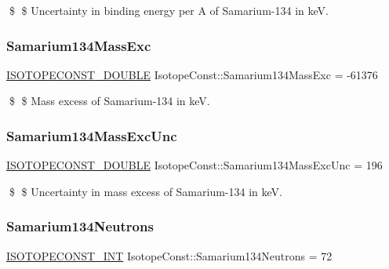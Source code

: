 \$ \$ Uncertainty in binding energy per A of Samarium-\/134 in keV. \mbox{\label{group___isotope_const-_samarium-_sm134_gabe20c1f5edc835d05b8cd90da8f85fe3}} 
\subsubsection{\texorpdfstring{Samarium134\+Mass\+Exc}{Samarium134MassExc}}
{\footnotesize\ttfamily \mbox{\hyperlink{group___isotope_const-_macros_ga8f45a7272ce02c0b4c65c44636ed719a}{I\+S\+O\+T\+O\+P\+E\+C\+O\+N\+S\+T\+\_\+\+D\+O\+U\+B\+LE}} Isotope\+Const\+::\+Samarium134\+Mass\+Exc = -\/61376}

\$ \$ Mass excess of Samarium-\/134 in keV. \mbox{\label{group___isotope_const-_samarium-_sm134_ga92df68505c7a766147aa4f3176ff574e}} 
\subsubsection{\texorpdfstring{Samarium134\+Mass\+Exc\+Unc}{Samarium134MassExcUnc}}
{\footnotesize\ttfamily \mbox{\hyperlink{group___isotope_const-_macros_ga8f45a7272ce02c0b4c65c44636ed719a}{I\+S\+O\+T\+O\+P\+E\+C\+O\+N\+S\+T\+\_\+\+D\+O\+U\+B\+LE}} Isotope\+Const\+::\+Samarium134\+Mass\+Exc\+Unc = 196}

\$ \$ Uncertainty in mass excess of Samarium-\/134 in keV. \mbox{\label{group___isotope_const-_samarium-_sm134_ga1265af2ac02f1dc5a048c2a4ae65d634}} 
\subsubsection{\texorpdfstring{Samarium134\+Neutrons}{Samarium134Neutrons}}
{\footnotesize\ttfamily \mbox{\hyperlink{group___isotope_const-_macros_ga5f18360b3e99483a35c32d789e62621c}{I\+S\+O\+T\+O\+P\+E\+C\+O\+N\+S\+T\+\_\+\+I\+NT}} Isotope\+Const\+::\+Samarium134\+Neutrons = 72}

